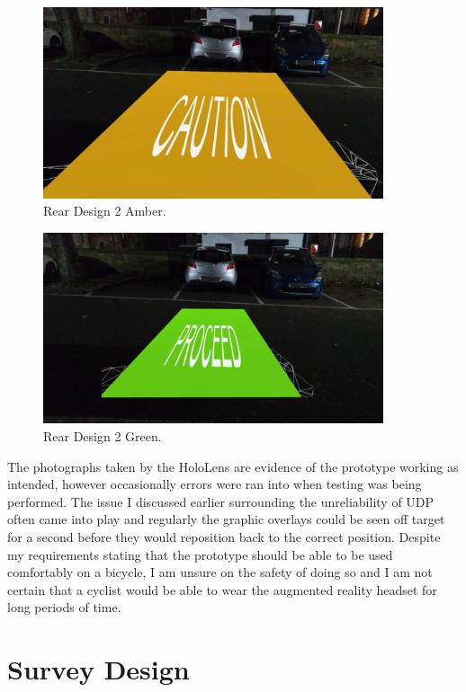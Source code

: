 \documentclass{l4proj}
\begin{document}
\begin{figure}[H]
    \centering
    \includegraphics[width=10cm]{images/design2.2.jpg}
    \caption{Rear Design 2 Amber.}
    \label{fig:real_rear_5}
\end{figure}

\begin{figure}[H]
    \centering
    \includegraphics[width=10cm]{images/design2.3.jpg}
    \caption{Rear Design 2 Green.}
    \label{fig:real_rear_6}
\end{figure}

The photographs taken by the HoloLens are evidence of the prototype working as intended, however occasionally errors were ran into when testing was being performed. The issue I discussed earlier surrounding the unreliability of UDP often came into play and regularly the graphic overlays could be seen off target for a second before they would reposition back to the correct position. Despite my requirements stating that the prototype should be able to be used comfortably on a bicycle, I am unsure on the safety of doing so and I am not certain that a cyclist would be able to wear the augmented reality headset for long periods of time.

\section{Survey Design}
\end{document}
